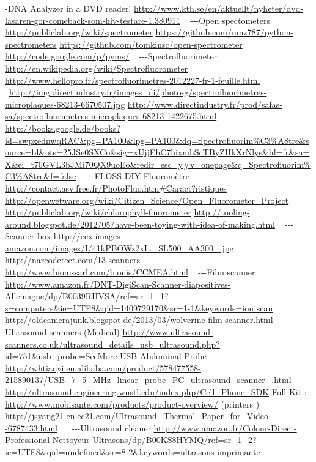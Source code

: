 \bigskip

\textstyleStrongEmphasis{{}-{}-}{}-DNA Analyzer in a DVD reader!
\url{http://www.kth.se/en/aktuellt/nyheter/dvd-lasaren-gor-comeback-som-hiv-testare-1.380911}
~
{}-{}-{}-Open spectometers
\url{http://publiclab.org/wiki/spectrometer}
\url{https://github.com/nmz787/python-spectrometers}
\url{https://github.com/tomkinsc/open-spectrometer}
\url{http://code.google.com/p/pyms/}
~
{}-{}-{}-Spectrofluorimeter
\url{http://en.wikipedia.org/wiki/Spectrofluorometer}
\url{http://www.hellopro.fr/spectrofluorimetres-2012227-fr-1-feuille.html}
~\url{http://img.directindustry.fr/images_di/photo-g/spectrofluorimetres-microplaques-68213-6670507.jpg}
\url{http://www.directindustry.fr/prod/safas-sa/spectrofluorimetres-microplaques-68213-1422675.html}
\href{http://books.google.de/books?id=swpxednwqRAC&pg=PA100&lpg=PA100&dq=Spectrofluorim?tre&source=bl&ots=25JSe0SXCo&sig=xUjjEhC7hixmhScTByZHkXrNlys&hl=fr&sa=X&ei=t70GVL3bJMi70QX9uoEo&redir_esc=y#v=onepage&q=Spectrofluorim?tre&f=false}{http://books.google.de/books?id=swpxednwqRAC\&pg=PA100\&lpg=PA100\&dq=Spectrofluorim\%C3\%A8tre\&source=bl\&ots=25JSe0SXCo\&sig=xUjjEhC7hixmhScTByZHkXrNlys\&hl=fr\&sa=X\&ei=t70GVL3bJMi70QX9uoEo\&redir\_esc=y\#v=onepage\&q=Spectrofluorim\%C3\%A8tre\&f=false}
~
{}-{}-{}-FLOSS DIY Fluorom\`etre
\url{http://contact.asv.free.fr/PhotoFluo.htm#Caract?ristiques}
\url{http://openwetware.org/wiki/Citizen_Science/Open_Fluorometer_Project}
\url{http://publiclab.org/wiki/chlorophyll-fluorometer}
\url{http://tooling-around.blogspot.de/2012/05/have-been-toying-with-idea-of-making.html}
~
{}-{}-{}-Scanner box
\url{http://ecx.images-amazon.com/images/I/41kPBOWz2xL._SL500_AA300_.jpg}
\url{http://narcodetect.com/13-scanners}
\url{http://www.bionissarl.com/bionis/CCMEA.html}
~
{}-{}-{}-Film scanner
\url{http://www.amazon.fr/DNT-DigiScan-Scanner-diapositives-Allemagne/dp/B0039RHVSA/ref=sr_1_1?s=computers&ie=UTF8&qid=1409729170&sr=1-1&keywords=ion
scan}
\url{http://oldcamerajunk.blogspot.de/2013/03/wolverine-film-scanner.html}
~
{}-{}-{}-Ultrasound scanners (Medical)
\url{http://www.ultrasound-scanners.co.uk/ultrasound_details_usb_ultrasound.php?id=751&usb_probe=SeeMore
USB Abdominal Probe}
\url{http://whtianyi.en.alibaba.com/product/578477558-215890137/USB_7_5_MHz_linear_probe_PC_ultrasound_scanner_.html}
\url{http://ultrasound.engineering.wustl.edu/index.php/Cell_Phone_SDK}
Full Kit : \url{http://www.mobisante.com/products/product-overview/}
(printers )
\url{http://jsyang21.en.ec21.com/Ultrasound_Thermal_Paper_for_Video--6787433.html}
~
~{}-{}-{}-Ultrasound cleaner
\url{http://www.amazon.fr/Colour-Direct-Professional-Nettoyeur-Ultrasons/dp/B00KS8HYMQ/ref=sr_1_2?ie=UTF8&qid=undefined&sr=8-2&keywords=ultrasons
imprimante}
